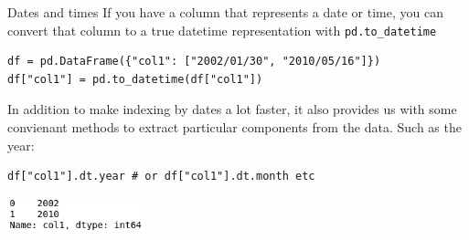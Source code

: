 \documentclass[10pt]{beamer}
\begin{document}
\begin{frame}[label={sec:orgcf50151},fragile]{Dates and times}
 If you have a column that represents a date or time, you can convert that column
to a true datetime representation with \texttt{pd.to\_datetime}

\begin{verbatim}
df = pd.DataFrame({"col1": ["2002/01/30", "2010/05/16"]})
df["col1"] = pd.to_datetime(df["col1"])
\end{verbatim}

In addition to make indexing by dates a lot faster, it also provides us with
some convienant methods to extract particular components from the data. Such as
the year:

\begin{verbatim}
df["col1"].dt.year # or df["col1"].dt.month etc
\end{verbatim}

\begin{center}
\includegraphics[width=0.3\textwidth]{images/year.png}
\end{center}
\end{frame}
\end{document}

